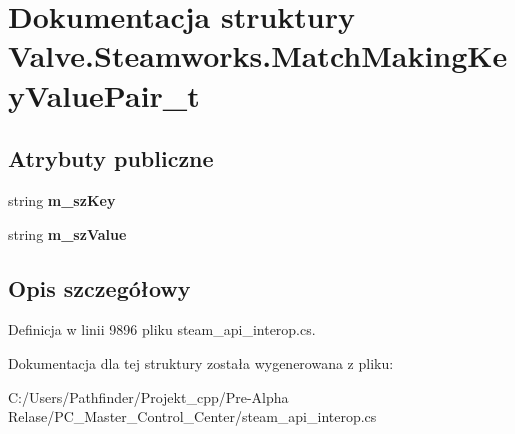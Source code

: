 \hypertarget{struct_valve_1_1_steamworks_1_1_match_making_key_value_pair__t}{}\section{Dokumentacja struktury Valve.\+Steamworks.\+Match\+Making\+Key\+Value\+Pair\+\_\+t}
\label{struct_valve_1_1_steamworks_1_1_match_making_key_value_pair__t}
\subsection*{Atrybuty publiczne}
\begin{DoxyCompactItemize}
\item 
\mbox{\label{struct_valve_1_1_steamworks_1_1_match_making_key_value_pair__t_ad2e87abbe878f27b3a9e238ef8f556f4}} 
string {\bfseries m\+\_\+sz\+Key}
\item 
\mbox{\label{struct_valve_1_1_steamworks_1_1_match_making_key_value_pair__t_a91b716d89121784762b6b469f4a7a475}} 
string {\bfseries m\+\_\+sz\+Value}
\end{DoxyCompactItemize}


\subsection{Opis szczegółowy}


Definicja w linii 9896 pliku steam\+\_\+api\+\_\+interop.\+cs.



Dokumentacja dla tej struktury została wygenerowana z pliku\+:\begin{DoxyCompactItemize}
\item 
C\+:/\+Users/\+Pathfinder/\+Projekt\+\_\+cpp/\+Pre-\/\+Alpha Relase/\+P\+C\+\_\+\+Master\+\_\+\+Control\+\_\+\+Center/steam\+\_\+api\+\_\+interop.\+cs\end{DoxyCompactItemize}
